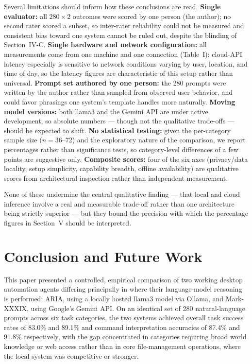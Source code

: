 \documentclass[conference]{IEEEtran}
\begin{document}
Several limitations should inform how these conclusions are read. \textbf{Single evaluator:} all $280 \times 2$ outcomes were scored by one person (the author); no second rater scored a subset, so inter-rater reliability could not be measured and consistent bias toward one system cannot be ruled out, despite the blinding of Section~IV-C. \textbf{Single hardware and network configuration:} all measurements come from one machine and one connection (Table~I); cloud-API latency especially is sensitive to network conditions varying by user, location, and time of day, so the latency figures are characteristic of this setup rather than universal. \textbf{Prompt set authored by one person:} the 280 prompts were written by the author rather than sampled from observed user behavior, and could favor phrasings one system's template handles more naturally. \textbf{Moving model versions:} both llama3 and the Gemini API are under active development, so absolute numbers --- though not the qualitative trade-offs --- should be expected to shift. \textbf{No statistical testing:} given the per-category sample size ($n = 36$--72) and the exploratory nature of the comparison, we report percentages rather than significance tests, so category-level differences of a few points are suggestive only. \textbf{Composite scores:} four of the six axes (privacy/data locality, setup simplicity, capability breadth, offline availability) are qualitative scores from architectural inspection rather than independent measurement.

None of these undermine the central qualitative finding --- that local and cloud inference involve a real and measurable trade-off rather than one architecture being strictly superior --- but they bound the precision with which the percentage figures in Section~V should be interpreted.

\section{Conclusion and Future Work}

This paper presented a controlled, empirical comparison of two working desktop automation agents differing principally in where their language-model reasoning is performed: ARIA, using a locally hosted llama3 model via Ollama, and Mark-XXXIX, using Google's Gemini API. On an identical set of 280 natural-language prompts across six task categories, the two systems achieved overall task success rates of 83.0\% and 89.1\% and command interpretation accuracies of 87.4\% and 91.8\% respectively, with the gap concentrated in categories requiring broad world knowledge or web access rather than in core file-management operations, where the local system was competitive or stronger.
\end{document}
